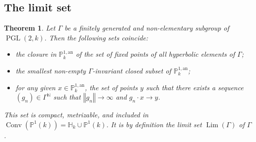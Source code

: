 \documentclass[11pt]{article}
\newtheorem{theo}{Theorem}[section]
\theoremstyle{definition}
\numberwithin{equation}{section}
\numberwithin{figure}{section}
\numberwithin{table}{section}
\DeclareMathOperator{\conv}{Conv}
\DeclareMathOperator{\Lm}{Lim}
\DeclareMathOperator{\PGL}{PGL}
\newcommand{\nn}{\mathbb{N}}
\newcommand{\hh}{\mathbb{H}}
\newcommand{\an}{\mathrm{an}}
\newcommand{\norm}[1]{\left\Vert#1\right\Vert}
\newcommand{\PP}{\mathbb{P}}
\newcommand{\PGLk}{\PGL(2, k)}
\begin{document}
\subsection{The limit set}

\begin{theo}\label{thm:struct limit}
Let $\Gamma$ be a finitely generated and non-elementary subgroup of $\PGLk$. Then the following sets coincide:
\begin{itemize}
\item the closure in $\PP^{1,\an}_k$ of the set of fixed points of all hyperbolic elements of $\Gamma$;
\item the smallest non-empty $\Gamma$-invariant closed subset of $\PP^{1,\an}_k$;
\item for any given $x\in \PP^{1,\an}_k$, the set of points $y$ such that there exists a sequence $(g_n)\in \Gamma^\nn$ such that $\norm{g_n}\to\infty$ and $g_n \cdot x \to y$.
\end{itemize}
This set is compact, metrizable, and included in $\conv(\PP^1(k)) =\hh_k \cup \PP^1(k)$. It is by definition the limit set $\Lm(\Gamma)$ of $\Gamma$.
\end{theo}
\end{document}
